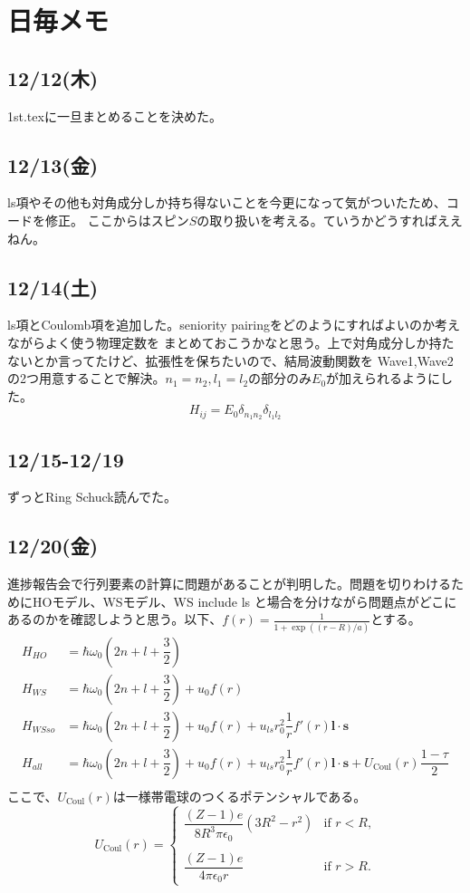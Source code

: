 \documentclass[a4paper,12pt]{jsreport}
\begin{document}
\tableofcontents
\chapter{日毎メモ}

\section*{12/12(木)}
1st.texに一旦まとめることを決めた。
\section*{12/13(金)}
ls項やその他も対角成分しか持ち得ないことを今更になって気がついたため、コードを修正。
ここからはスピン$S$の取り扱いを考える。ていうかどうすればええねん。
\section*{12/14(土)}
ls項とCoulomb項を追加した。seniority pairingをどのようにすればよいのか考えながらよく使う物理定数を
まとめておこうかなと思う。上で対角成分しか持たないとか言ってたけど、拡張性を保ちたいので、結局波動関数を
Wave1,Wave2の2つ用意することで解決。$n_1=n_2,l_1=l_2$の部分のみ$E_0$が加えられるようにした。
\begin{equation}
  H_{ij}=E_0\delta_{n_1n_2}\delta_{l_1l_2}
\end{equation}
\section*{12/15-12/19}
ずっとRing Schuck読んでた。
\section*{12/20(金)}
進捗報告会で行列要素の計算に問題があることが判明した。問題を切りわけるためにHOモデル、WSモデル、WS include ls
と場合を分けながら問題点がどこにあるのかを確認しようと思う。以下、$f(r)=\frac{1}{1+\exp{((r-R)/a)}}$とする。
\begin{align*}
  H_{HO}&=\hbar \omega_0\left(2n+l+\dfrac{3}{2}\right)\\
  H_{WS}&=\hbar \omega_0\left(2n+l+\dfrac{3}{2}\right)+u_0 f(r)\\
  H_{WSso}&=\hbar \omega_0\left(2n+l+\dfrac{3}{2}\right)+u_0 f(r)+u_{ls}r_0^2\dfrac{1}{r}f'(r)\bm{l}\cdot\bm{s}\\
  H_{all}&=\hbar \omega_0\left(2n+l+\dfrac{3}{2}\right)+u_0 f(r)+u_{ls}r_0^2\dfrac{1}{r}f'(r)\bm{l}\cdot\bm{s}+U_{\text{Coul}}(r)\dfrac{1-\tau}{2}\\
\end{align*}
ここで、$U_{\text{Coul}}(r)$は一様帯電球のつくるポテンシャルである。
\begin{equation}
  U_{\text{Coul}}(r)=
  \begin{cases}
    \dfrac{(Z-1)e}{8R^3\pi\epsilon_0}(3R^2-r^2) & \text{if $r<R$,} \\
    \\
    \dfrac{(Z-1)e}{4\pi\epsilon_0r}& \text{if $r>R$.}
  \end{cases}
\end{equation}
\end{document}
